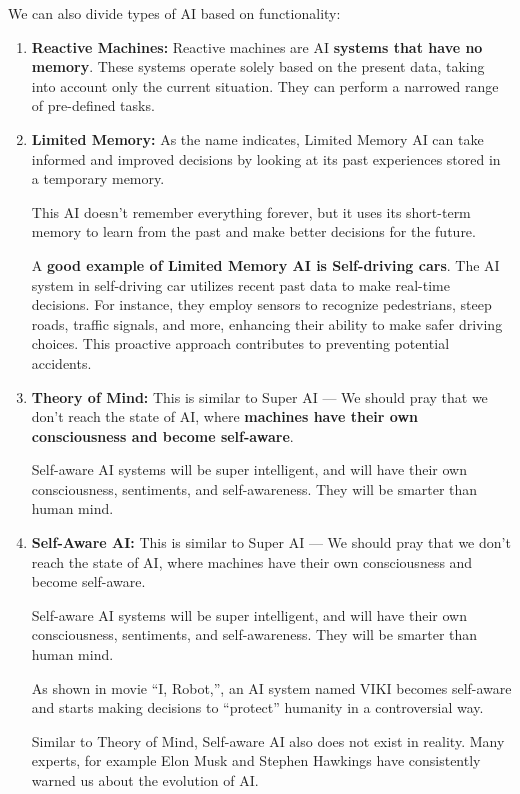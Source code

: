 \documentclass[12pt,a4paper]{report}
\begin{document}
We can also divide types of AI based on functionality: \begin{enumerate}
    \item \textbf{Reactive Machines:} Reactive machines are AI \textbf{systems that have no memory}. These systems operate solely based on the present data, taking into account only the current situation. They can perform a narrowed range of pre-defined tasks.
    \item \textbf{ Limited Memory:} As the name indicates, Limited Memory AI can take informed and improved decisions by looking at its past experiences stored in a temporary memory.

This AI doesn’t remember everything forever, but it uses its short-term memory to learn from the past and make better decisions for the future.

A \textbf{good example of Limited Memory AI is Self-driving cars}. The AI system in self-driving car utilizes recent past data to make real-time decisions. For instance, they employ sensors to recognize pedestrians, steep roads, traffic signals, and more, enhancing their ability to make safer driving choices. This proactive approach contributes to preventing potential accidents.
    \item \textbf{Theory of Mind:} This is similar to Super AI — We should pray that we don’t reach the state of AI, where\textbf{ machines have their own consciousness and become self-aware}.

Self-aware AI systems will be super intelligent, and will have their own consciousness, sentiments, and self-awareness. They will be smarter than human mind. 
    \item \textbf{Self-Aware AI:} This is similar to Super AI — We should pray that we don’t reach the state of AI, where machines have their own consciousness and become self-aware.

Self-aware AI systems will be super intelligent, and will have their own consciousness, sentiments, and self-awareness. They will be smarter than human mind.

As shown in movie “I, Robot,”, an AI system named VIKI becomes self-aware and starts making decisions to “protect” humanity in a controversial way.

Similar to Theory of Mind, Self-aware AI also does not exist in reality. Many experts, for example Elon Musk and Stephen Hawkings have consistently warned us about the evolution of AI.
\end{enumerate}
\end{document}
